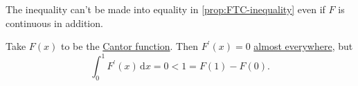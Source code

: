 \begin{eg}
	The inequality can't be made into equality in \autoref{prop:FTC-inequality} even if \(F\) is continuous in addition.
\end{eg}
\begin{explanation}
	Take \(F(x)\) to be the \hyperref[sssec:Cantor-Function]{Cantor function}.
	Then \(F^\prime(x) = 0\) \hyperref[def:mu-almost-everywhere]{almost everywhere}, but
	\[
		\int_0^1 F^\prime(x) \,\mathrm{d}x = 0 < 1 = F(1) - F(0).
	\]
\end{explanation}